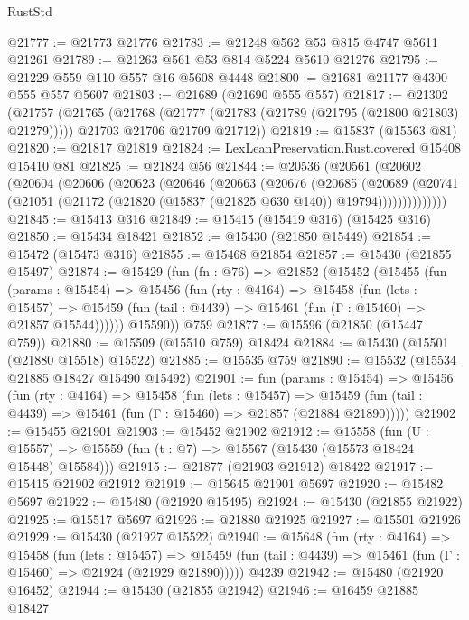 \begin{lexlean}{RustStd}
\begin{coremodule}
{\begin{coremodule}
{{{{{{{{{{{{{{{{{{{{{{{{{{{{{{{{{{{{{{{{{{{{{{{{{{{{{{{{{{{{@21777 := @21773 @21776
@21783 := @21248 @562 @53 @815 @4747 @5611 @21261
@21789 := @21263 @561 @53 @814 @5224 @5610 @21276
@21795 := @21229 @559 @110 @557 @16 @5608 @4448
@21800 := @21681 @21177 @4300 @555 @557 @5607
@21803 := @21689 (@21690 @555 @557)
@21817 := @21302
    (@21757
      (@21765
        (@21768 (@21777 (@21783 (@21789 (@21795 (@21800 @21803) @21279)))))
        @21703
        @21706
        @21709
        @21712))
@21819 := @15837 (@15563 @81)
@21820 := @21817 @21819
@21824 := LexLeanPreservation.Rust.covered @15408 @15410 @81
@21825 := @21824 @56
@21844 := @20536
    (@20561
      (@20602
        (@20604
          (@20606
            (@20623
              (@20646
                (@20663
                  (@20676
                    (@20685
                      (@20689
                        (@20741
                          (@21051 (@21172 (@21820 (@15837 (@21825 @630 @140)) @19794))))))))))))))
@21845 := @15413 @316
@21849 := @15415 (@15419 @316) (@15425 @316)
@21850 := @15434 @18421
@21852 := @15430 (@21850 @15449)
@21854 := @15472 (@15473 @316)
@21855 := @15468 @21854
@21857 := @15430 (@21855 @15497)
@21874 := @15429
    (fun (fn : @76) =>
    @21852
      (@15452
        (@15455
          (fun (params : @15454) =>
          @15456
            (fun (rty : @4164) =>
            @15458
              (fun (lets : @15457) =>
              @15459 (fun (tail : @4439) => @15461 (fun (Γ : @15460) => @21857 @15544))))))
        @15590))
    @759
@21877 := @15596 (@21850 (@15447 @759))
@21880 := @15509 (@15510 @759) @18424
@21884 := @15430 (@15501 (@21880 @15518) @15522)
@21885 := @15535 @759
@21890 := @15532 (@15534 @21885 @18427 @15490 @15492)
@21901 := fun (params : @15454) =>
  @15456
    (fun (rty : @4164) =>
    @15458
      (fun (lets : @15457) =>
      @15459 (fun (tail : @4439) => @15461 (fun (Γ : @15460) => @21857 (@21884 @21890)))))
@21902 := @15455 @21901
@21903 := @15452 @21902
@21912 := @15558
    (fun (U : @15557) => @15559 (fun (t : @7) => @15567 (@15430 (@15573 @18424 @15448) @15584)))
@21915 := @21877 (@21903 @21912) @18422
@21917 := @15415 @21902 @21912
@21919 := @15645 @21901 @5697
@21920 := @15482 @5697
@21922 := @15480 (@21920 @15495)
@21924 := @15430 (@21855 @21922)
@21925 := @15517 @5697
@21926 := @21880 @21925
@21927 := @15501 @21926
@21929 := @15430 (@21927 @15522)
@21940 := @15648
    (fun (rty : @4164) =>
    @15458
      (fun (lets : @15457) =>
      @15459 (fun (tail : @4439) => @15461 (fun (Γ : @15460) => @21924 (@21929 @21890)))))
    @4239
@21942 := @15480 (@21920 @16452)
@21944 := @15430 (@21855 @21942)
@21946 := @16459 @21885 @18427
}}}}}}}}}}}}}}}}}}}}}}}}}}}}}}}}}}}}}}}}}}}}}}}}}}}}}}}}}}}}
\end{coremodule}}
\end{coremodule}
\end{lexlean}
